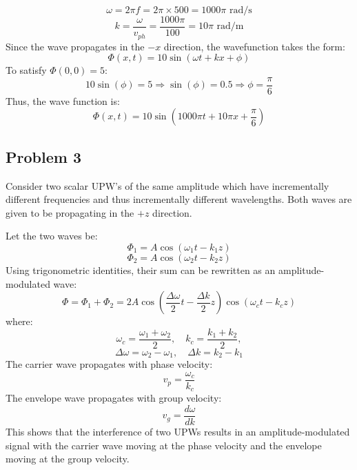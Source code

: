 \documentclass{article}
\begin{document}
\begin{equation}
    \omega = 2\pi f = 2\pi \times 500 = 1000\pi \text{ rad/s}
\end{equation}
\begin{equation}
    k = \frac{\omega}{v_{ph}} = \frac{1000\pi}{100} = 10\pi \text{ rad/m}
\end{equation}
Since the wave propagates in the $-x$ direction, the wavefunction takes the form:
\begin{equation}
    \Phi(x,t) = 10 \sin(\omega t + kx + \phi)
\end{equation}
To satisfy $\Phi(0,0) = 5$:
\begin{equation}
    10 \sin(\phi) = 5 \Rightarrow \sin(\phi) = 0.5 \Rightarrow \phi = \frac{\pi}{6}
\end{equation}
Thus, the wave function is:
\begin{equation}
    \Phi(x,t) = 10 \sin(1000\pi t + 10\pi x + \frac{\pi}{6})
\end{equation}

\subsection{Problem 3}
Consider two scalar UPW’s of the same amplitude which have incrementally different frequencies and thus incrementally different wavelengths. Both waves are given to be propagating in the $+z$ direction.

Let the two waves be:
\begin{equation}
    \Phi_1 = A \cos(\omega_1 t - k_1 z)
\end{equation}
\begin{equation}
    \Phi_2 = A \cos(\omega_2 t - k_2 z)
\end{equation}
Using trigonometric identities, their sum can be rewritten as an amplitude-modulated wave:
\begin{equation}
    \Phi = \Phi_1 + \Phi_2 = 2A \cos \left( \frac{\Delta \omega}{2} t - \frac{\Delta k}{2} z \right) \cos \left( \omega_c t - k_c z \right)
\end{equation}
where:
\begin{equation}
    \omega_c = \frac{\omega_1 + \omega_2}{2}, \quad k_c = \frac{k_1 + k_2}{2},
\end{equation}
\begin{equation}
    \Delta \omega = \omega_2 - \omega_1, \quad \Delta k = k_2 - k_1
\end{equation}
The carrier wave propagates with phase velocity:
\begin{equation}
    v_p = \frac{\omega_c}{k_c}
\end{equation}
The envelope wave propagates with group velocity:
\begin{equation}
    v_g = \frac{d\omega}{dk}
\end{equation}
This shows that the interference of two UPWs results in an amplitude-modulated signal with the carrier wave moving at the phase velocity and the envelope moving at the group velocity.
\end{document}
